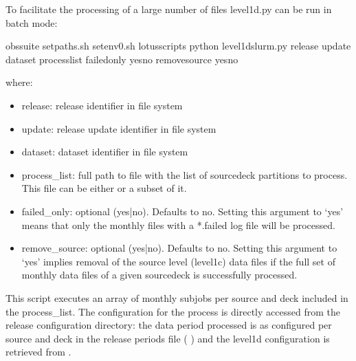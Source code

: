 \documentclass[letterpaper,10pt,english]{sphinxmanual}
\begin{document}
To facilitate the processing of a large number of files level1d.py can be run
in batch mode:

\begin{sphinxVerbatim}[commandchars=\\\{\}]
 obs\PYGZhy{}suite
 setpaths.sh
 setenv0.sh
 lotus\PYGZus{}scripts
python level1d\PYGZus{}slurm.py release update dataset  process\PYGZus{}list \PYGZhy{}\PYGZhy{}failed\PYGZus{}only yesno \PYGZhy{}\PYGZhy{}remove\PYGZus{}source yesno
\end{sphinxVerbatim}

where:
\begin{itemize}
\item {} 
release: release identifier in file system

\item {} 
update: release update identifier in file system

\item {} 
dataset: dataset identifier in file system

\item {} 
process\_list: full path to file with the list of source\sphinxhyphen{}deck partitions to
process. This file can be either {\hyperref[\detokenize{index:process-list-file}]{}} or a subset of it.

\item {} 
failed\_only: optional (yes|no). Defaults to no. Setting this argument to ‘yes’
means that only the monthly files with a *.failed log file will be processed.

\item {} 
remove\_source: optional (yes|no). Defaults to no. Setting this argument to ‘yes’
implies removal of the source level (level1c) data files if the full set of
monthly data files of a given source\sphinxhyphen{}deck is successfully processed.

\end{itemize}

This script executes an array of monthly subjobs per source and deck included in
the process\_list. The configuration for the process is directly accessed from
the release configuration directory: the data period processed is as configured
per source and deck in the release periods file ( {\hyperref[\detokenize{index:release-periods-file}]{}})
and the level1d configuration is retrieved from {\hyperref[\detokenize{index:level1d-config-file}]{}}.
\end{document}
